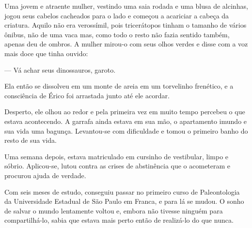 Uma jovem e atraente mulher, vestindo uma saia rodada e uma blusa de
alcinhas, jogou seus cabelos cacheados para o lado e começou a acariciar
a cabeça da criatura. Aquilo não era verossímil, pois tricerátopos
tinham o tamanho de vários ônibus, não de uma vaca mas, como todo o
resto não fazia sentido também, apenas deu de ombros. A mulher mirou-o
com seus olhos verdes e disse com a voz mais doce que tinha ouvido:

--- Vá achar seus dinossauros, garoto.

Ela então se dissolveu em um monte de areia em um torvelinho frenético,
e a consciência de Érico foi arrastada junto até ele acordar.

Desperto, ele olhou ao redor e pela primeira vez em muito tempo percebeu
o que estava acontecendo. A garrafa ainda estava em sua mão, o
apartamento imundo e sua vida uma bagunça. Levantou-se com dificuldade e
tomou o primeiro banho do resto de sua vida.

Uma semana depois, estava matriculado em cursinho de vestibular, limpo e
sóbrio. Aplicou-se, lutou contra as crises de abstinência que o
acometeram e procurou ajuda de verdade.

Com seis meses de estudo, conseguiu passar no primeiro curso de
Paleontologia da Universidade Estadual de São Paulo em Franca, e para lá
se mudou. O sonho de salvar o mundo lentamente voltou e, embora não
tivesse ninguém para compartilhá-lo, sabia que estava mais perto então
de realizá-lo do que nunca.
